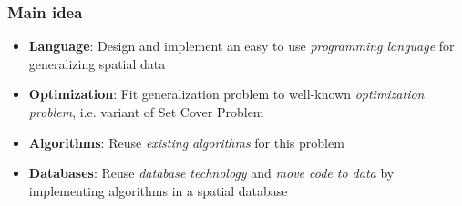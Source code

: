 \documentclass{beamer}
\begin{document}
\frame
{
  \frametitle{Main idea}
  \begin{itemize}
  \item \textbf{Language}: Design and implement an easy to use \emph{programming language} for generalizing spatial data 
  \item \textbf{Optimization}: Fit generalization problem to well-known \emph{optimization problem}, i.e. variant of Set Cover Problem~\cite{vazirani}
  \item \textbf{Algorithms}: Reuse \emph{existing algorithms} for this problem
  \item \textbf{Databases}: Reuse \emph{database technology} and \emph{move code to data} by implementing algorithms in a spatial database
  \end{itemize}
  \begin{center}
  \end{center}
}



\end{document}
